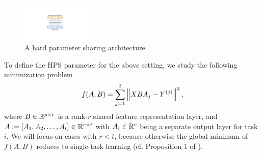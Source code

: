 \begin{figure}[!t]
	\centering
	\includegraphics[width=0.3\textwidth,valign=t]{figures/mtl_model_arch.pdf}
	\caption{A hard parameter sharing architecture}
	\label{fig_intro_arch}
\end{figure}


	To define the HPS parameter for the above setting, we study the following minimization problem %
	\begin{align}
		f(A, B) = \sum_{j=1}^t \bignorm{X B A_j - Y^{(j)}}^2, \label{eq_mtl_same_cov}
	\end{align}
	where $B \in \mathbb{R}^{p \times r}$ is a rank-$r$ shared feature representation layer, and $A := [A_1, A_2, \dots, A_t] \in \mathbb{R}^{r \times t}$ with $A_i \in \mathbb{R}^r$ being a separate output layer for task $i$. %
We will focus on cases with $r < t$, because otherwise the global minimum of $f(A, B)$ reduces to single-task learning (cf. Proposition 1 of \cite{WZR20}).


